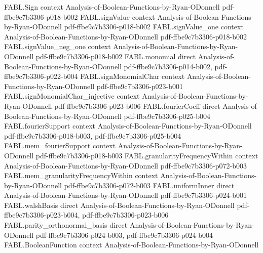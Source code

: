 \begin{theorem}
\label{FABL.eval_krawtchoukPolynomial_eq_coeff}
\leanok
{}
\proofstep
  {FABL.Sign}
  {context}
  {Analysis-of-Boolean-Functions-by-Ryan-ODonnell}
  {pdf-ffbe9c7b3306-p018-b002}
\proofstep
  {FABL.signValue}
  {context}
  {Analysis-of-Boolean-Functions-by-Ryan-ODonnell}
  {pdf-ffbe9c7b3306-p018-b002}
\proofstep
  {FABL.signValue_one}
  {context}
  {Analysis-of-Boolean-Functions-by-Ryan-ODonnell}
  {pdf-ffbe9c7b3306-p018-b002}
\proofstep
  {FABL.signValue_neg_one}
  {context}
  {Analysis-of-Boolean-Functions-by-Ryan-ODonnell}
  {pdf-ffbe9c7b3306-p018-b002}
\proofstep
  {FABL.monomial}
  {direct}
  {Analysis-of-Boolean-Functions-by-Ryan-ODonnell}
  {pdf-ffbe9c7b3306-p014-b002,
    pdf-ffbe9c7b3306-p022-b004}
\proofstep
  {FABL.signMonomialChar}
  {context}
  {Analysis-of-Boolean-Functions-by-Ryan-ODonnell}
  {pdf-ffbe9c7b3306-p023-b001}
\proofstep
  {FABL.signMonomialChar_injective}
  {context}
  {Analysis-of-Boolean-Functions-by-Ryan-ODonnell}
  {pdf-ffbe9c7b3306-p023-b006}
\proofstep
  {FABL.fourierCoeff}
  {direct}
  {Analysis-of-Boolean-Functions-by-Ryan-ODonnell}
  {pdf-ffbe9c7b3306-p025-b004}
\proofstep
  {FABL.fourierSupport}
  {context}
  {Analysis-of-Boolean-Functions-by-Ryan-ODonnell}
  {pdf-ffbe9c7b3306-p018-b003,
    pdf-ffbe9c7b3306-p025-b004}
\proofstep
  {FABL.mem_fourierSupport}
  {context}
  {Analysis-of-Boolean-Functions-by-Ryan-ODonnell}
  {pdf-ffbe9c7b3306-p018-b003}
\proofstep
  {FABL.granularityFrequencyWithin}
  {context}
  {Analysis-of-Boolean-Functions-by-Ryan-ODonnell}
  {pdf-ffbe9c7b3306-p072-b003}
\proofstep
  {FABL.mem_granularityFrequencyWithin}
  {context}
  {Analysis-of-Boolean-Functions-by-Ryan-ODonnell}
  {pdf-ffbe9c7b3306-p072-b003}
\proofstep
  {FABL.uniformInner}
  {direct}
  {Analysis-of-Boolean-Functions-by-Ryan-ODonnell}
  {pdf-ffbe9c7b3306-p024-b001}
\proofstep
  {FABL.walshBasis}
  {direct}
  {Analysis-of-Boolean-Functions-by-Ryan-ODonnell}
  {pdf-ffbe9c7b3306-p023-b004,
    pdf-ffbe9c7b3306-p023-b006}
\proofstep
  {FABL.parity_orthonormal_basis}
  {direct}
  {Analysis-of-Boolean-Functions-by-Ryan-ODonnell}
  {pdf-ffbe9c7b3306-p024-b003,
    pdf-ffbe9c7b3306-p024-b004}
\proofstep
  {FABL.BooleanFunction}
  {context}
  {Analysis-of-Boolean-Functions-by-Ryan-ODonnell}

\end{theorem}
